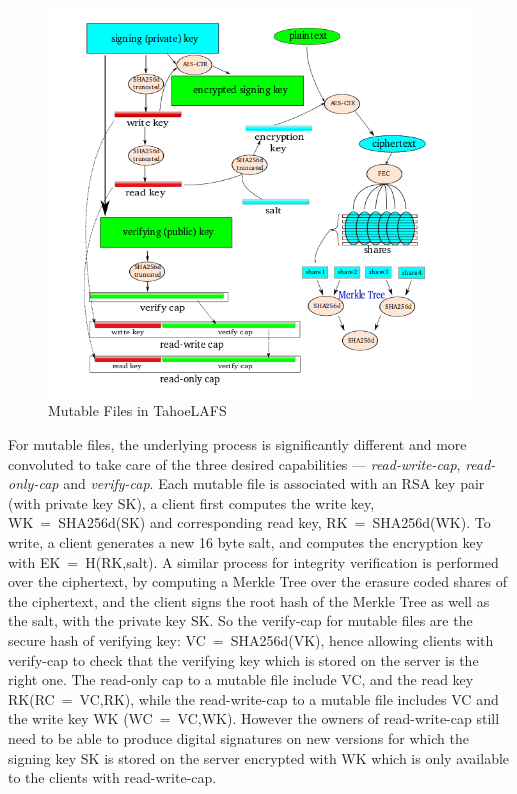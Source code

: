 \begin{figure}[h]
\centering
\includegraphics[scale = 0.4]{img/mutable}
\caption{Mutable Files in TahoeLAFS}
\label{mutable}
\end{figure}

For mutable files, the underlying process is significantly different and more convoluted to take care of the three desired capabilities --- \textit{read-write-cap}, \textit{read-only-cap} and \textit{verify-cap}. Each mutable file is associated with an RSA key pair (with private key SK), a client first computes the write key, WK~=~SHA256d(SK) and corresponding read key, RK~=~SHA256d(WK). To write, a client generates a new 16 byte salt, and computes the encryption key with EK~=~H(RK,salt). A similar process for integrity verification is performed over the ciphertext, by computing a Merkle Tree over the erasure coded shares of the ciphertext, and the client signs the root hash of the Merkle Tree as well as the salt, with the private key SK. So the verify-cap for mutable files are the secure hash of verifying key: VC~=~SHA256d(VK), hence allowing clients with verify-cap to check that the verifying key which is stored on the server is the right one. The read-only cap to a mutable file include VC, and the read key RK(RC~=~VC,RK), while the read-write-cap to a mutable file includes VC and the write key WK (WC~=~VC,WK). However the owners of read-write-cap still need to be able to produce digital signatures on new versions for which the signing key SK is stored on the server encrypted with WK which is only available to the clients with read-write-cap. 

